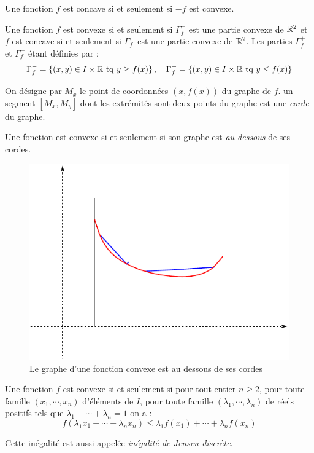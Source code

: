 \begin{defi}
Une fonction $f$ est concave si et seulement si $-f$ est convexe.
\end{defi}
\begin{prop}
  Une fonction $f$ est convexe si et seulement si $\Gamma_f^+$ est une partie convexe de $\mathbb{R}^2$ et $f$ est concave si et seulement si $\Gamma_f^-$ est une partie convexe de $\mathbb{R}^2$. Les parties $\Gamma_f^+$ et $\Gamma_f^-$ étant définies par :
\begin{displaymath}
 \Gamma_f^- = \left\lbrace (x,y)\in I\times \mathbb{R} \text{ tq } y\geq f(x) \right\rbrace, \quad
 \Gamma_f^+ = \left\lbrace (x,y)\in I\times \mathbb{R} \text{ tq } y\leq f(x) \right\rbrace
\end{displaymath}
\end{prop}
\begin{nota}
 On désigne par $M_x$ le point de coordonnées $(x,f(x))$ du graphe de $f$. un segment $[M_x,M_y]$ dont les extrémités sont deux points du graphe est une \emph{corde} du graphe.
\end{nota}
\begin{prop}
 Une fonction est convexe si et seulement si son graphe est \emph{au dessous} de ses cordes.
\end{prop}
\begin{figure}[ht]
 \centering
 \includegraphics{C2071_4.pdf}
 \caption{Le graphe d'une fonction convexe est au dessous de ses cordes}
\end{figure}
\begin{prop}
 Une fonction $f$ est convexe si et seulement si pour tout entier $n\geq2$, pour toute famille $(x_1,\cdots,x_n)$ d'éléments de $I$, pour toute famille $(\lambda_1,\cdots,\lambda_n)$ de réels positifs tels que $\lambda_1 + \cdots +\lambda_n =1$ on a :
\begin{displaymath}
 f(\lambda_1 x_1+ \cdots +\lambda_n x_n) \leq \lambda_1f(x_1)+\cdots +\lambda_n f(x_n)
\end{displaymath}
\end{prop}
\begin{rem}
 Cette inégalité est aussi appelée \emph{inégalité de Jensen discrète}. 
\end{rem}


